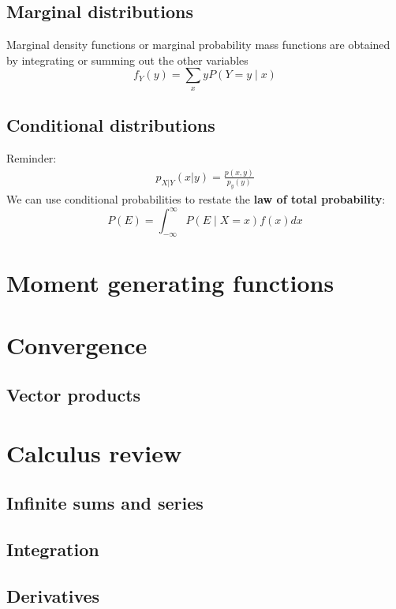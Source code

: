 \documentclass{article}
\begin{document}
\subsection{Marginal distributions}
Marginal density functions or marginal probability mass functions are obtained by integrating or summing out the other variables
\begin{equation*}
    f_Y(y) = \sum_x y P(Y = y \mid x)
\end{equation*}

\subsection{Conditional distributions}
\textrm{Reminder: }
\begin{align*}
    p_{X|Y}(x|y) = \frac{p(x,y)}{p_y(y)}
\end{align*}
We can use conditional probabilities to restate the \textbf{law of total probability}:
\begin{equation*}
    P(E) = \int_{-\infty}^\infty P(E \mid X=x)f(x)dx
\end{equation*}

\section{Moment generating functions}

\section{Convergence}
\subsection{Vector products}

\section{Calculus review}
\subsection{Infinite sums and series}
\subsection{Integration}
\subsection{Derivatives}
\end{document}
